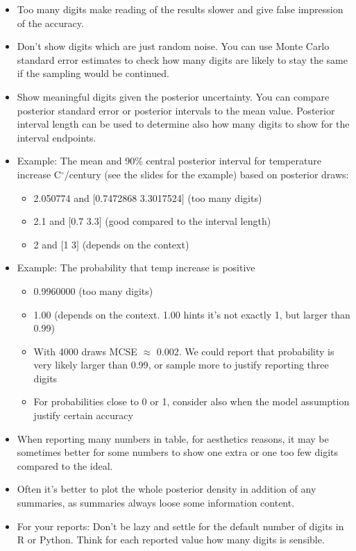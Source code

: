 \documentclass[a4paper,11pt,english]{article}
\begin{document}
  \begin{itemize}
  \item Too many digits make reading of the results slower and give
    false impression of the accuracy. 
  \item Don't show digits which are just random noise. You can use
    Monte Carlo standard error estimates to check how many digits are
    likely to stay the same if the sampling would be continued.
  \item Show meaningful digits given the posterior uncertainty. You can compare posterior standard error or posterior intervals to the mean value. Posterior interval length can be used to determine also how many digits to show for the interval endpoints.
  \item Example: The mean and 90\% central posterior interval for
    temperature increase C$^\circ$/century (see the slides for the
    example) based on posterior draws:
     \begin{itemize}
     \item {\color{red} 2.050774 and $[$0.7472868 3.3017524$]$} (too many digits)
     \item {\color{darkgreen} 2.1 and $[$0.7 3.3$]$} (good
       compared to the interval length)
    \item {\color{navyblue} 2 and $[$1 3$]$} (depends on the context)
     \end{itemize}
   \item Example: The probability that temp increase is positive
     \begin{itemize}
     \item {\color{red} 0.9960000} (too many digits)
     \item {\color{navyblue} 1.00} (depends on the context. 1.00 hints
       it's not exactly 1, but larger than 0.99)
     \item With 4000 draws MCSE $\approx$ 0.002. We could report that
       probability is {\color{darkgreen} very likely larger than
         0.99}, or sample more to justify reporting three digits
     \item For probabilities close to 0 or 1, consider also when the
       model assumption justify certain accuracy
     \end{itemize}
   \item When reporting many numbers in table, for aesthetics reasons,
     it may be sometimes better for some numbers to show one extra or
     one too few digits compared to the ideal.
   \item Often it's better to plot the whole posterior density in
     addition of any summaries, as summaries always loose some
     information content.
   \item For your reports: Don't be lazy and settle for the default
     number of digits in R or Python. Think for each reported value
     how many digits is sensible.
   \end{itemize}
\end{document}
